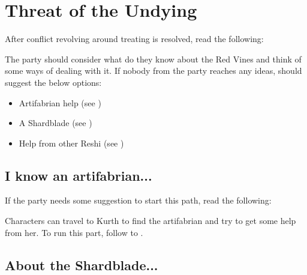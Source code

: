 \newpage %
\section{Threat of the Undying}

After conflict revolving around treating \npcSickGirl{} is resolved, read the following:


The party should consider what do they know about the Red Vines and think of some ways of dealing with it. If nobody from the party reaches any ideas, \npcBabsk{} should suggest the below options:

\begin{itemize}
	\item Artifabrian help (see )
	\item A Shardblade (see )
	\item Help from other Reshi (see )
\end{itemize}

\subsection{I know an artifabrian...}
\label{ssec:helpArtifabrian}

If the party needs some suggestion to start this path, read the following:


Characters can travel to Kurth to find the artifabrian and try to get some help from her. To run this part, follow to .

\newpage
\subsection{About the Shardblade...}
\label{ssec:helpShardblade}

